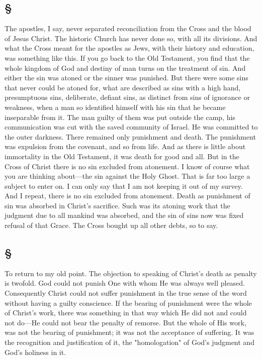 \documentclass[draft]{ptfdoc}
\begin{document}
\subsection*{
\S
}


The apostles, I say, never separated reconciliation 
from the Cross and the blood of Jesus 
Christ. The historic Church has never done so, 
with all its divisions. And what the Cross 
meant for the apostles as Jews, with their history 
and education, was something like this. If 
you go back to the Old Testament, you find 
that the whole kingdom of God and destiny of 
man turns on the treatment of sin. And either 
the sin was atoned or the sinner was punished. 
But there were some sins that never could be 
atoned for, what are described as sins with 
a high hand, presumptuous sins, deliberate, 
defiant sins, as distinct from sins of ignorance 
or weakness, when a man so identified himself 
with his sin that he became inseparable from 
it. The man guilty of them was put outside 
the camp, his communication was cut with the 
saved community of Israel. He was committed 
to the outer darkness. There remained only 
punishment and death. The punishment was 
expulsion from the covenant, and so from life. 
And as there is little about immortality in 
the Old Testament, it was death for good and 
all. But in the Cross of Christ there is no 
sin excluded from atonement. I know of 
course what you are thinking about---the sin 
against the Holy Ghost. That is far too large 
a subject to enter on. I can only say that 
I am not keeping it out of my survey. 
And I repeat, there is no sin excluded from 
atonement. Death as punishment of sin was 
absorbed in Christ's sacrifice. Such was its 
atoning work that the judgment due to all 
mankind was absorbed, and the sin of sins 
now was fixed refusal of that Grace. The 
Cross bought up all other debts, so to say. 

\subsection*{
\S
}

To return to my old point. The objection to 
speaking of Christ's death as penalty is twofold. 
God could not punish One with whom 
He was always well pleased. Consequently 
Christ could not suffer punishment in the true 
sense of the word without having a guilty 
conscience. If the bearing of punishment were 
the whole of Christ's work, there was something 
in that way which He did not and could not do---He 
could not bear the penalty of remorse. But 
the whole of His work, was not the bearing of 
punishment; it was not the acceptance of suffering. 
It was the recognition and justification of 
it, the "homologation" of God's judgment and 
God's holiness in it. 
\end{document}
